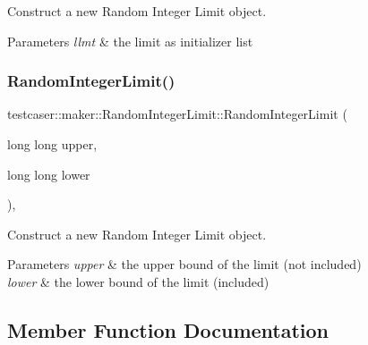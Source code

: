 Construct a new Random Integer Limit object. 


\begin{DoxyParams}{Parameters}
{\em llmt} & the limit as initializer list \\
\hline
\end{DoxyParams}
\mbox{\label{classtestcaser_1_1maker_1_1RandomIntegerLimit_a43781197d959fc8ab6cf54258df35a64}} 
\subsubsection{\texorpdfstring{RandomIntegerLimit()}{RandomIntegerLimit()}\hspace{0.1cm}{\footnotesize\ttfamily [2/2]}}
{\footnotesize\ttfamily testcaser\+::maker\+::\+Random\+Integer\+Limit\+::\+Random\+Integer\+Limit (\begin{DoxyParamCaption}\item[{long long}]{upper,  }\item[{long long}]{lower }\end{DoxyParamCaption})\hspace{0.3cm}{\ttfamily [inline]}, {\ttfamily [explicit]}}



Construct a new Random Integer Limit object. 


\begin{DoxyParams}{Parameters}
{\em upper} & the upper bound of the limit (not included) \\
\hline
{\em lower} & the lower bound of the limit (included) \\
\hline
\end{DoxyParams}


\subsection{Member Function Documentation}
\mbox{\label{classtestcaser_1_1maker_1_1RandomIntegerLimit_a657f8d368dbfe2e9269d1d499a728954}} 
